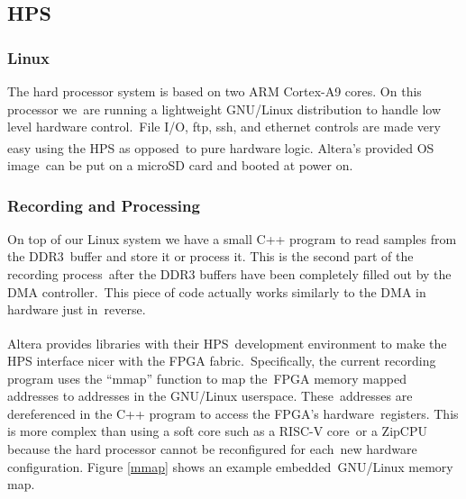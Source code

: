 \documentclass{article}
\begin{document}

\subsection{HPS}

\subsubsection{Linux}
The hard processor system is based on two ARM Cortex-A9 cores.  On this processor we\ are running a lightweight GNU/Linux distribution to handle low level hardware control.\
File I/O, ftp, ssh, and ethernet controls are made very easy using the HPS as opposed\
to pure hardware logic. Altera\textsuperscript{\textregistered{}}'s provided OS image\
can be put on a microSD card and booted at power on.

\subsubsection{Recording and Processing}
On top of our Linux system we have a small C++ program to read samples from the DDR3\
buffer and store it or process it.  This is the second part of the recording process\
after the DDR3 buffers have been completely filled out by the DMA controller.\
This piece of code actually works similarly to the DMA in hardware just in\
reverse. 

Altera\textsuperscript{\textregistered{}} provides libraries with their HPS\
development environment to make the HPS interface nicer with the FPGA fabric.\
Specifically, the current recording program uses the ``mmap'' function to map the\
FPGA memory mapped addresses to addresses in the GNU/Linux userspace. These\
addresses are dereferenced in the C++ program to access the FPGA's hardware\
registers. This is more complex than using a soft core such as a RISC-V core\
or a ZipCPU because the hard processor cannot be reconfigured for each\
new hardware configuration. Figure \ref{mmap} shows an example embedded\
GNU/Linux memory map.
\end{document}
